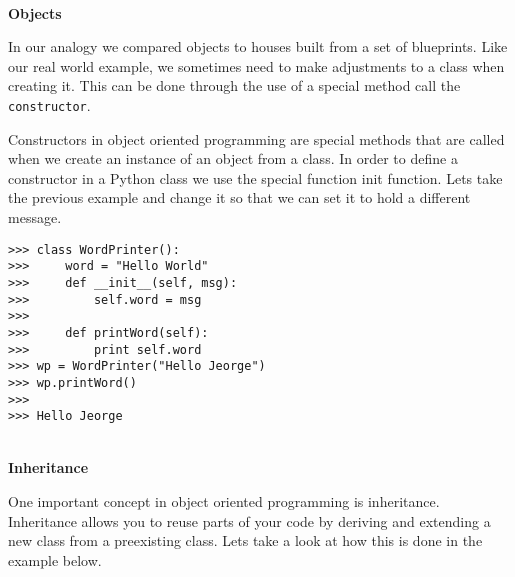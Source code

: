 \documentclass[letterpaper,11pt]{article}
\begin{document}
\\
\textbf{Objects}
\par{In our analogy we compared objects to houses built from a set of
blueprints.  Like our real world example, we sometimes need to make adjustments
to a class when creating it. This can be done through the use of a special
method call the \texttt{constructor}.}
\par{Constructors in object oriented programming are special methods that are
    called when we create an instance of an object from a class. In order to
    define a constructor in a Python class we use the special function init
    function.  Lets take the previous example and change it so that we can set
it to hold a different message.}
\\
\begin{minipage}{.5\textwidth}
    \begin{tcolorbox}
        \begin{footnotesize}
            \begin{verbatim}
>>> class WordPrinter():
>>>     word = "Hello World"
>>>     def __init__(self, msg):
>>>         self.word = msg
>>>
>>>     def printWord(self):
>>>         print self.word
>>> wp = WordPrinter("Hello Jeorge")
>>> wp.printWord()
>>>
>>> Hello Jeorge
            \end{verbatim}
        \end{footnotesize}
    \end{tcolorbox}
\end{minipage}
\\
\textbf{Inheritance}
\par{One important concept in object oriented programming is inheritance.
Inheritance allows you to reuse parts of your code by deriving and extending a
new class from a preexisting class. Lets take a look at how this is done in the
example below.}
\\
\begin{minipage}{.5\textwidth}
\end{minipage}
\end{document}
